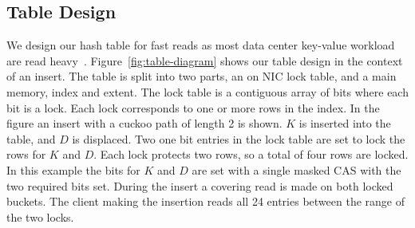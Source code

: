 


\subsection{Table Design}


We design our hash table for fast reads as most data center
key-value workload are read heavy~\cite{facebook-memcached}.
Figure~\ref{fig:table-diagram} shows our table design in the
context of an insert. The table is split into two parts, an
on NIC lock table, and a main memory, index and extent. The
lock table is a contiguous array of bits where each bit is a
lock. Each lock corresponds to one or more rows in the
index. In the figure an insert with a cuckoo path of length
2 is shown. $K$ is inserted into the table, and $D$ is
displaced. Two one bit entries in the lock table are set to
lock the rows for $K$ and $D$. Each lock protects two rows,
so a total of four rows are locked. In this example the bits
for $K$ and $D$ are set with a single masked CAS with the
two required bits set. During the insert a covering read is
made on both locked buckets. The client making the insertion
reads all 24 entries between the range of the two locks.

